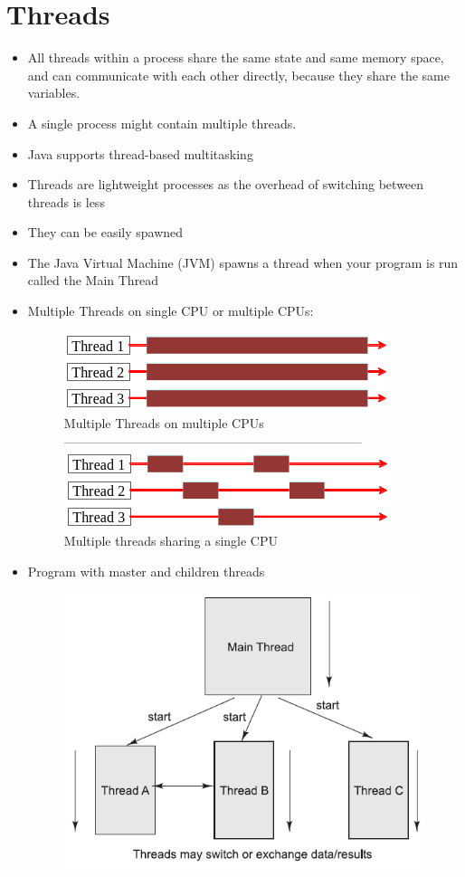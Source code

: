 \documentclass[12pt, a4paper]{book}
\begin{document}
\section{Threads}
\begin{itemize}
    \item All threads within a process share the same state and same memory space, and can communicate with each other directly, because they share the same variables.
    \item A single process might contain multiple threads.
    \item Java supports thread-based multitasking
    \item Threads are lightweight processes as the overhead of switching between threads is less
    \item They can be easily spawned
    \item The Java Virtual Machine (JVM) spawns a thread when your program is run called the Main Thread
    \item Multiple Threads on single CPU or multiple CPUs:\begin{figure}[h]
              \includegraphics[width=0.4\linewidth]{figures/Multiple-threads-on-multiple-CPUs.png}
              Multiple Threads on multiple CPUs
              \\ ----------------------------------------------------------------------- \\
              \includegraphics[width=0.4\linewidth]{figures/Multiple-threads-sharing-a-single-CPU.png}
              Multiple threads sharing a single CPU
          \end{figure}
    \item Program with master and children threads \begin{figure}[h]
              \centering
              \includegraphics[width=0.6\linewidth]{figures/Program-with-master-and-children-threads.png}
          \end{figure}
\end{itemize}
\end{document}
